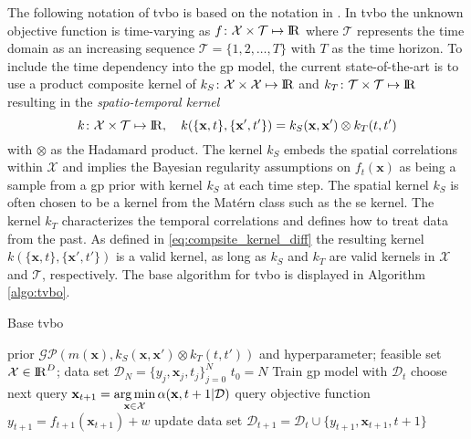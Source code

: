 The following notation of \gls{tvbo} is based on the notation in \cite{Wang_2021}. In \gls{tvbo} the unknown objective function is time-varying as $f\colon \mathcal{X} \times \mathcal{T} \mapsto \mathrm{I\!R}$ where $\mathcal{T}$ represents the time domain as an increasing sequence $\mathcal{T} = \{1,2, \dots, T\}$ with $T$ as the time horizon. To include the time dependency into the \gls{gp} model, the current state-of-the-art is to use a product composite kernel of $k_{S}\colon \mathcal{X} \times \mathcal{X} \mapsto \mathrm{I\!R}$ and $k_{T}\colon \mathcal{T} \times \mathcal{T} \mapsto \mathrm{I\!R}$ resulting in the \emph{spatio-temporal kernel}
\begin{equation}
    k\colon \mathcal{X} \times \mathcal{T} \mapsto \mathrm{I\!R}, \quad k(\{\mathbf{x},t\},\{\mathbf{x}',t'\}) = k_{S}(\mathbf{x}, \mathbf{x}') \otimes k_{T}(t, t')
    \label{eq:spatio_temporal_kernel}
\end{equation}
with $\otimes$ as the Hadamard product.
The kernel $k_S$ embeds the spatial correlations within $\mathcal{X}$ and implies the Bayesian regularity assumptions on $f_t(\mathbf{x})$ as being a sample from a \gls{gp} prior with kernel $k_S$ at each time step. The spatial kernel $k_S$ is often chosen to be a kernel from the Matérn class such as the \gls{se} kernel. The kernel $k_T$ characterizes the temporal correlations and defines how to treat data from the past. As defined in \eqref{eq:compsite_kernel_diff} the resulting kernel $k(\{\mathbf{x},t\},\{\mathbf{x}',t'\})$ is a valid kernel, as long as $k_S$ and $k_T$ are valid kernels in $\mathcal{X}$ and $\mathcal{T}$, respectively. 
The base algorithm for \gls{tvbo} is displayed in Algorithm \ref{algo:tvbo}.

\begin{algorithm}[h]
\centering
\caption{Base \gls{tvbo}}
\begin{algorithmic}[1]
\Require prior $\mathcal{GP}(m(\mathbf{x}), k_S(\mathbf{x},\mathbf{x}') \otimes k_T(t, t'))$ and hyperparameter; feasible set ${\mathcal{X}\in \mathrm{I\!R}^D}$; data set $\mathcal{D}_{N} = \{y_j, \mathbf{x}_j, t_j\}_{j=0}^{N}$ 
\State $t_0=N$
    \State Train \gls{gp} model with $\mathcal{D}_t$
    \State choose next query $\mathbf{x}_{t+1} = \underset{\mathbf{x}\in \mathcal{X}}{\arg\min} \,\alpha(\mathbf{x}, t+1|\mathcal{D})$
    \State query objective function $y_{t+1} = f_{t+1}(\mathbf{x}_{t+1}) + w$
    \State update data set $\mathcal{D}_{t+1} = \mathcal{D}_{t} \cup \{y_{t+1}, \mathbf{x}_{t+1}, t+1\}$
\EndFor
\end{algorithmic}
\label{algo:tvbo}
\end{algorithm}

